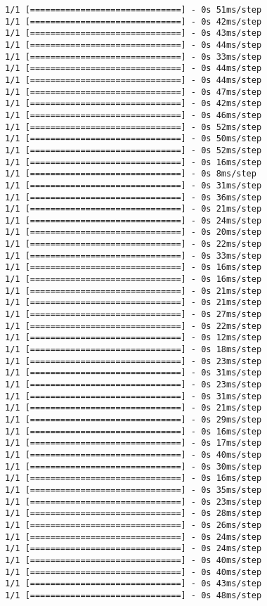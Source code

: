 \documentclass[11pt]{article}
\begin{document}
\begin{Verbatim}[commandchars=\\\{\}]
1/1 [==============================] - 0s 51ms/step
1/1 [==============================] - 0s 42ms/step
1/1 [==============================] - 0s 43ms/step
1/1 [==============================] - 0s 44ms/step
1/1 [==============================] - 0s 33ms/step
1/1 [==============================] - 0s 44ms/step
1/1 [==============================] - 0s 44ms/step
1/1 [==============================] - 0s 47ms/step
1/1 [==============================] - 0s 42ms/step
1/1 [==============================] - 0s 46ms/step
1/1 [==============================] - 0s 52ms/step
1/1 [==============================] - 0s 50ms/step
1/1 [==============================] - 0s 52ms/step
1/1 [==============================] - 0s 16ms/step
1/1 [==============================] - 0s 8ms/step
1/1 [==============================] - 0s 31ms/step
1/1 [==============================] - 0s 36ms/step
1/1 [==============================] - 0s 21ms/step
1/1 [==============================] - 0s 24ms/step
1/1 [==============================] - 0s 20ms/step
1/1 [==============================] - 0s 22ms/step
1/1 [==============================] - 0s 33ms/step
1/1 [==============================] - 0s 16ms/step
1/1 [==============================] - 0s 16ms/step
1/1 [==============================] - 0s 21ms/step
1/1 [==============================] - 0s 21ms/step
1/1 [==============================] - 0s 27ms/step
1/1 [==============================] - 0s 22ms/step
1/1 [==============================] - 0s 12ms/step
1/1 [==============================] - 0s 18ms/step
1/1 [==============================] - 0s 23ms/step
1/1 [==============================] - 0s 31ms/step
1/1 [==============================] - 0s 23ms/step
1/1 [==============================] - 0s 31ms/step
1/1 [==============================] - 0s 21ms/step
1/1 [==============================] - 0s 29ms/step
1/1 [==============================] - 0s 16ms/step
1/1 [==============================] - 0s 17ms/step
1/1 [==============================] - 0s 40ms/step
1/1 [==============================] - 0s 30ms/step
1/1 [==============================] - 0s 16ms/step
1/1 [==============================] - 0s 35ms/step
1/1 [==============================] - 0s 23ms/step
1/1 [==============================] - 0s 28ms/step
1/1 [==============================] - 0s 26ms/step
1/1 [==============================] - 0s 24ms/step
1/1 [==============================] - 0s 24ms/step
1/1 [==============================] - 0s 40ms/step
1/1 [==============================] - 0s 40ms/step
1/1 [==============================] - 0s 43ms/step
1/1 [==============================] - 0s 48ms/step

\end{Verbatim}
\end{document}
